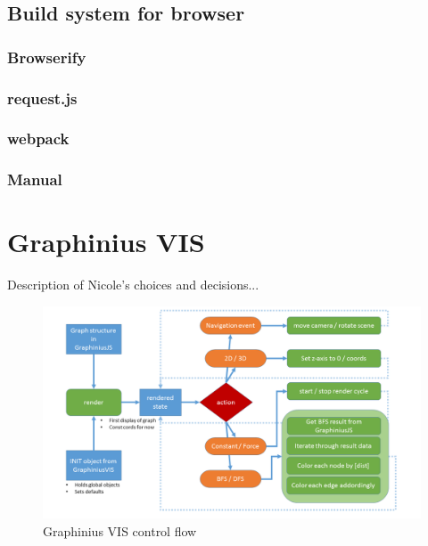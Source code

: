 	\subsection{Build system for browser}
		\label{ssect:build_browser}
		
		\subsubsection{Browserify}
		\label{sssect:browserify}
		
		\subsubsection{request.js}
		\label{sssect:request_js}
		
		\subsubsection{webpack}
		\label{sssect:webpack}
		
		\subsubsection{Manual}
		\label{sssect:manual}



\section{Graphinius VIS}
\label{sect:graphinius_vis}

Description of Nicole's choices and decisions...

\begin{landscape}
\begin{figure}[ht]
	\label{fig_vis_control_flow}
	\hspace*{-1cm}
	\includegraphics[width=1.9\textwidth]{figures/VIS_Control_Flow}
	\caption{Graphinius VIS control flow}
\end{figure}
\end{landscape}


